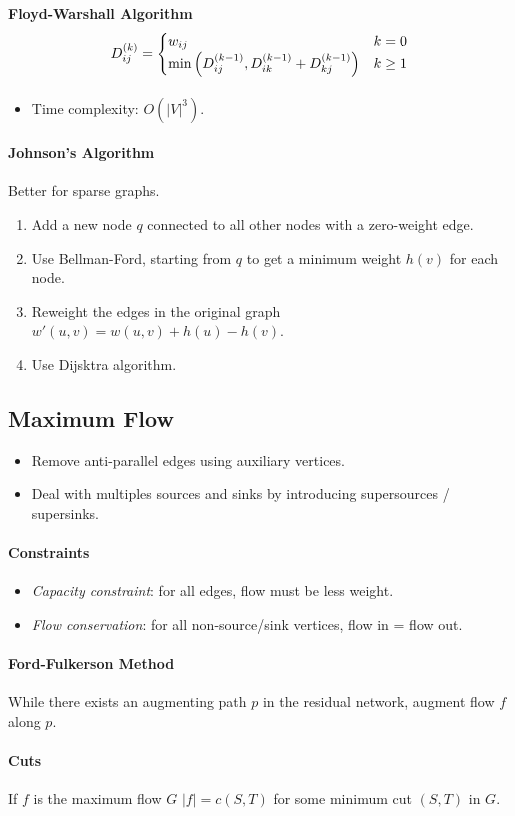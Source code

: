\documentclass[twocolumn,english]{article}
\numberwithin{equation}{section}
\numberwithin{figure}{section}
\numberwithin{table}{section}
\begin{document}
\paragraph{Floyd-Warshall Algorithm
\[
D_{ij}^{\left(k\right)}=\protect\begin{cases}
w_{ij} & k=0\protect\\
\min\left(D_{ij}^{\left(k-1\right)},D_{ik}^{\left(k-1\right)}+D_{kj}^{\left(k-1\right)}\right) & k\geq1
\protect\end{cases}
\]
}
\begin{itemize}
\item Time complexity: $O\left(\left|V\right|^{3}\right)$.
\end{itemize}

\paragraph{Johnson's Algorithm}

Better for sparse graphs.
\begin{enumerate}
\item Add a new node $q$ connected to all other nodes with a zero-weight
edge.
\item Use Bellman-Ford, starting from $q$ to get a minimum weight $h\left(v\right)$
for each node.
\item Reweight the edges in the original graph \textemdash{} $w'\left(u,v\right)=w\left(u,v\right)+h\left(u\right)-h\left(v\right)$.
\item Use Dijsktra algorithm.
\end{enumerate}

\subsection{Maximum Flow}
\begin{itemize}
\item Remove anti-parallel edges using auxiliary vertices.
\item Deal with multiples sources and sinks by introducing supersources
/ supersinks.
\end{itemize}

\paragraph{Constraints}
\begin{itemize}
\item \emph{Capacity constraint}: for all edges, flow must be less weight.
\item \emph{Flow conservation}: for all non-source/sink vertices, flow in
= flow out.
\end{itemize}

\paragraph{Ford-Fulkerson Method}

While there exists an augmenting path $p$ in the residual network,
augment flow $f$ along $p$.

\paragraph{Cuts}

If $f$ is the maximum flow $G$ $\left|f\right|=c\left(S,T\right)$
for some minimum cut $\left(S,T\right)$ in $G$.
\end{document}
